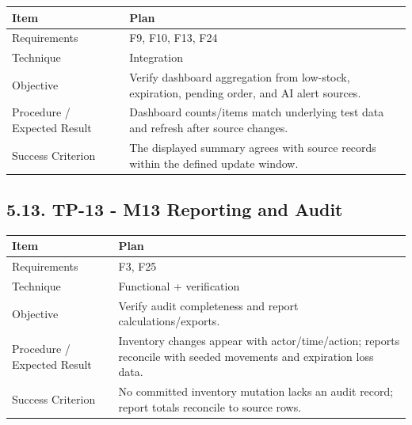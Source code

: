 {\def\LTcaptype{none} %
\begin{longtable}[]{|
  >{\raggedright\arraybackslash}m{}|
  >{\raggedright\arraybackslash}m{}|}
\hline
\begin{minipage}[c]{\linewidth}\raggedright
\textbf{Item}
\end{minipage} & \begin{minipage}[c]{\linewidth}\raggedright
\textbf{Plan}
\end{minipage} \\
\hline
\endhead

\endlastfoot
Requirements & F9, F10, F13, F24 \\ \hline
Technique & Integration \\ \hline
Objective & Verify dashboard aggregation from low-stock, expiration, pending order, and AI alert sources. \\ \hline
Procedure / Expected Result & Dashboard counts/items match underlying test data and refresh after source changes. \\ \hline
Success Criterion & The displayed summary agrees with source records within the defined update window. \\ \hline
\end{longtable}
}

\subsection{5.13. TP-13 - M13 Reporting and Audit}\label{tp-13---m13-reporting-and-audit}

{\def\LTcaptype{none} %
\begin{longtable}[]{|
  >{\raggedright\arraybackslash}m{}|
  >{\raggedright\arraybackslash}m{}|}
\hline
\begin{minipage}[c]{\linewidth}\raggedright
\textbf{Item}
\end{minipage} & \begin{minipage}[c]{\linewidth}\raggedright
\textbf{Plan}
\end{minipage} \\
\hline
\endhead

\endlastfoot
Requirements & F3, F25 \\ \hline
Technique & Functional + verification \\ \hline
Objective & Verify audit completeness and report calculations/exports. \\ \hline
Procedure / Expected Result & Inventory changes appear with actor/time/action; reports reconcile with seeded movements and expiration loss data. \\ \hline
Success Criterion & No committed inventory mutation lacks an audit record; report totals reconcile to source rows. \\ \hline
\end{longtable}
}


